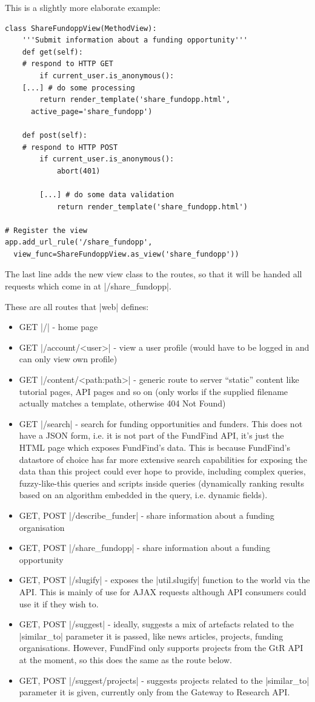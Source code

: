 This is a slightly more elaborate example:
\begin{verbatim}
class ShareFundoppView(MethodView):
    '''Submit information about a funding opportunity'''
    def get(self):
    # respond to HTTP GET
        if current_user.is_anonymous():
	[...] # do some processing
        return render_template('share_fundopp.html',
	  active_page='share_fundopp')

    def post(self):
    # respond to HTTP POST
        if current_user.is_anonymous():
            abort(401)

	    [...] # do some data validation
            return render_template('share_fundopp.html')

# Register the view
app.add_url_rule('/share_fundopp', 
  view_func=ShareFundoppView.as_view('share_fundopp'))
\end{verbatim}

The last line adds the new view class to the routes, so that it will be handed all requests which come in at |/share_fundopp|.

These are all routes that |web| defines:
\begin{itemize}
\item GET |/| - home page
\item GET |/account/<user>| - view a user profile (would have to be logged in and can only view own profile)
\item GET |/content/<path:path>| - generic route to server ``static'' content like tutorial pages, API pages and so on (only works if the supplied filename actually matches a template, otherwise 404 Not Found)
\item GET |/search| - search for funding opportunities and funders. This does not have a JSON form, i.e. it is not part of the FundFind API, it's just the HTML page which exposes FundFind's data. This is because FundFind's datastore of choice has far more extensive search capabilities for exposing the data than this project could ever hope to provide, including complex queries, fuzzy-like-this queries and scripts inside queries (dynamically ranking results based on an algorithm embedded in the query, i.e. dynamic fields).
\item GET, POST |/describe_funder| - share information about a funding organisation
\item GET, POST |/share_fundopp| - share information about a funding opportunity
\item GET, POST |/slugify| - exposes the |util.slugify| function to the world via the API. This is mainly of use for AJAX requests although API consumers could use it if they wish to.
\item GET, POST |/suggest| - ideally, suggests a mix of artefacts related to the |similar_to| parameter it is passed, like news articles, projects, funding organisations. However, FundFind only supports projects from the GtR API at the moment, so this does the same as the route below.
\item GET, POST |/suggest/projects| - suggests projects related to the |similar_to| parameter it is given, currently only from the Gateway to Research API.
\end{itemize}


